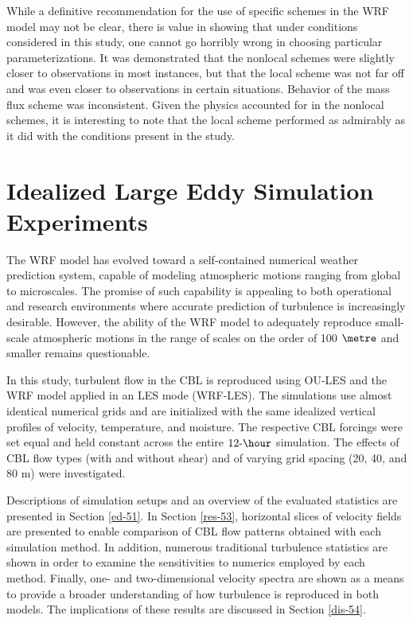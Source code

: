 While a definitive recommendation for the use of specific schemes in the WRF model may not be clear, there is value in showing that under conditions considered in this study, one cannot go horribly wrong in choosing particular parameterizations. It was demonstrated that the nonlocal schemes were slightly closer to observations in most instances, but that the local scheme was not far off and was even closer to observations in certain situations. Behavior of the mass flux scheme was inconsistent. Given the physics accounted for in the nonlocal schemes, it is interesting to note that the local scheme performed as admirably as it did with the conditions present in the study. 

\chapter{Idealized Large Eddy Simulation Experiments}
\label{les-5}

The WRF model has evolved toward a self-contained numerical weather prediction system, capable of modeling atmospheric motions ranging from global to microscales. The promise of such capability is appealing to both operational and research environments where accurate prediction of turbulence is increasingly desirable. However, the ability of the WRF model to adequately reproduce small-scale atmospheric motions in the range of scales on the order of 100 $\metre$  and smaller remains questionable.

In this study, turbulent flow in the CBL is reproduced using OU-LES and the WRF model applied in an LES mode (WRF-LES). The simulations use almost identical numerical grids and are initialized with the same idealized vertical profiles of velocity, temperature, and moisture. The respective CBL forcings were set equal and held constant across the entire $12\mbox{-}\hour$ simulation. The effects of CBL flow types (with and without shear) and of varying grid spacing (20, 40, and 80 m) were investigated.

Descriptions of simulation setups and an overview of the evaluated statistics are presented in Section \autoref{ed-51}. In Section \autoref{res-53}, horizontal slices of velocity fields are presented to enable comparison of CBL flow patterns obtained with each simulation method. In addition, numerous traditional turbulence statistics are shown in order to examine the sensitivities to numerics employed by each method. Finally, one- and two-dimensional velocity spectra are shown as a means to provide a broader understanding of how turbulence is reproduced in both models. The implications of these results are discussed in Section \autoref{dis-54}.


